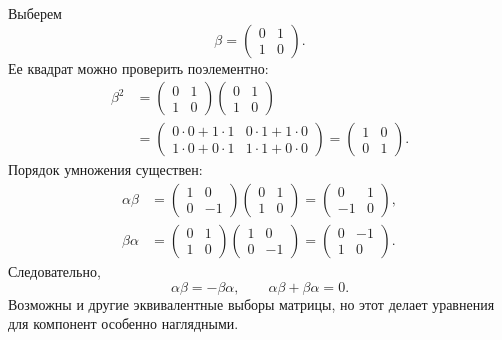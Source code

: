 Выберем
\begin{equation}
\beta=
\begin{pmatrix}
0&1\\
1&0
\end{pmatrix}.
\end{equation}
Ее квадрат можно проверить поэлементно:
\begin{equation}
\begin{aligned}
\beta^2
&=
\begin{pmatrix}
0&1\\
1&0
\end{pmatrix}
\begin{pmatrix}
0&1\\
1&0
\end{pmatrix}\\
&=
\begin{pmatrix}
0\cdot0+1\cdot1&0\cdot1+1\cdot0\\
1\cdot0+0\cdot1&1\cdot1+0\cdot0
\end{pmatrix}
=
\begin{pmatrix}
1&0\\
0&1
\end{pmatrix}.
\end{aligned}
\end{equation}
Порядок умножения существен:
\begin{align}
\alpha\beta
&=
\begin{pmatrix}
1&0\\
0&-1
\end{pmatrix}
\begin{pmatrix}
0&1\\
1&0
\end{pmatrix}
=
\begin{pmatrix}
0&1\\
-1&0
\end{pmatrix},\\
\beta\alpha
&=
\begin{pmatrix}
0&1\\
1&0
\end{pmatrix}
\begin{pmatrix}
1&0\\
0&-1
\end{pmatrix}
=
\begin{pmatrix}
0&-1\\
1&0
\end{pmatrix}.
\end{align}
Следовательно,
\begin{equation}
\alpha\beta=-\beta\alpha,
\qquad
\alpha\beta+\beta\alpha=0.
\end{equation}
Возможны и другие эквивалентные выборы матрицы, но этот делает уравнения для компонент особенно наглядными.


